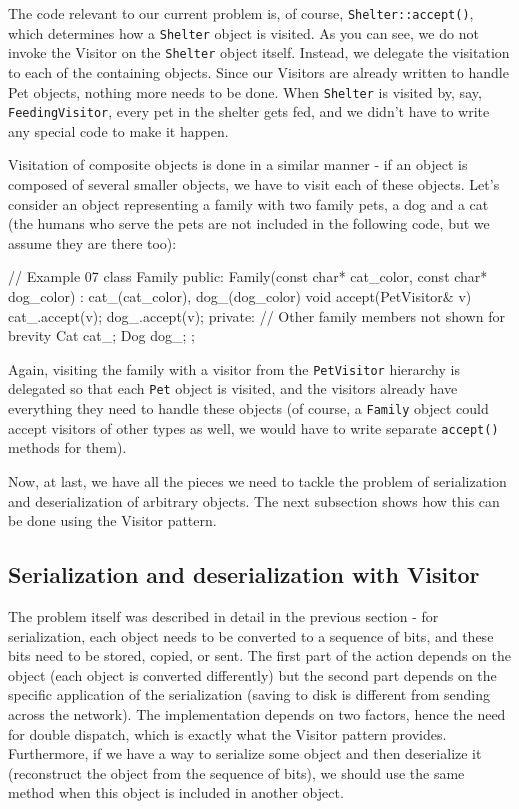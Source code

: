 The code relevant to our current problem is, of course, \texttt{Shelter::accept()}, which determines how a \texttt{Shelter} object is visited. As you can see, we do not invoke the Visitor on the \texttt{Shelter} object itself. Instead, we delegate the visitation to each of the containing objects. Since our Visitors are already written to handle Pet objects, nothing more needs to be done. When \texttt{Shelter} is visited by, say, \texttt{FeedingVisitor}, every pet in the shelter gets fed, and we didn't have to write any special code to make it happen.

Visitation of composite objects is done in a similar manner - if an object is composed of several smaller objects, we have to visit each of these objects. Let's consider an object representing a family with two family pets, a dog and a cat (the humans who serve the pets are not included in the following code, but we assume they are there too):

\begin{code}
// Example 07
class Family {
  public:
  Family(const char* cat_color, const char* dog_color) :
  cat_(cat_color), dog_(dog_color) {}
  void accept(PetVisitor& v) {
    cat_.accept(v);
    dog_.accept(v);
  }
  private: // Other family members not shown for brevity
  Cat cat_;
  Dog dog_;
};
\end{code}

Again, visiting the family with a visitor from the \texttt{PetVisitor} hierarchy is delegated so that each \texttt{Pet} object is visited, and the visitors already have everything they need to handle these objects (of course, a \texttt{Family} object could accept visitors of other types as well, we would have to write separate \texttt{accept()} methods for them).

Now, at last, we have all the pieces we need to tackle the problem of serialization and deserialization of arbitrary objects. The next subsection shows how this can be done using the Visitor pattern.

\subsection{Serialization and deserialization with Visitor}

The problem itself was described in detail in the previous section - for serialization, each object needs to be converted to a sequence of bits, and these bits need to be stored, copied, or sent. The first part of the action depends on the object (each object is converted differently) but the second part depends on the specific application of the serialization (saving to disk is different from sending across the network). The implementation depends on two factors, hence the need for double dispatch, which is exactly what the Visitor pattern provides. Furthermore, if we have a way to serialize some object and then deserialize it (reconstruct the object from the sequence of bits), we should use the same method when this object is included in another object.

